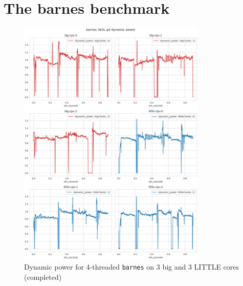 \newpage
\section{The barnes benchmark}
\begin{figure}[H]
    \centering
    \includegraphics[width=0.8\textwidth]{roi-plots/barnes/3b3L/p4-success-dyn-pow.png}
    \caption{Dynamic power for 4-threaded \texttt{barnes} on 3 big and 3 LITTLE 
             cores (completed)}
\end{figure}

